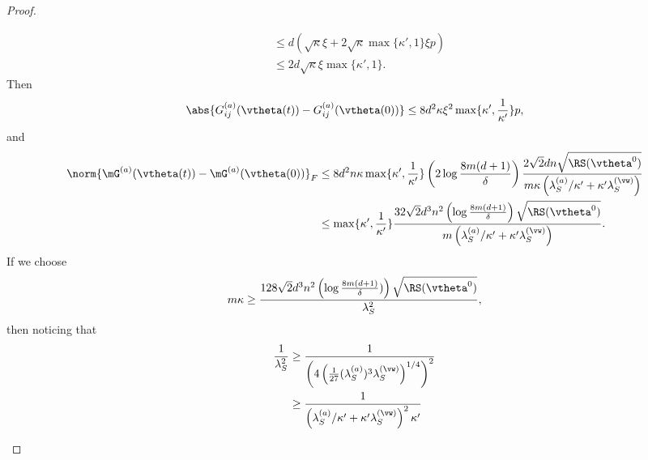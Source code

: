 \documentclass{article}
\begin{document}
\begin{proof}
\begin{enumerate}[(a)]
\begin{enumerate}[(i)]
\begin{equation}
\begin{aligned}
                                 & \leq d\left(\sqrt{\kappa}\xi+2\sqrt{\kappa}\max\{\kappa',1\}\xi p\right)          \\
                                 & \leq 2d\sqrt{\kappa}\xi\max\{\kappa',1\}.
                            \end{aligned}
                        \end{equation}
                        Then
                        \begin{equation}
                            \abs{G_{ij}^{(a)}(\vtheta(t)) - G_{ij}^{(a)}(\vtheta(0))} \leq 8d^2\kappa\xi^2\max\{\kappa',\frac{1}{\kappa'}\}p,
                        \end{equation}
                        and
                        \begin{equation}
                            \begin{aligned}
                                \norm{\mG^{(a)}(\vtheta(t)) - \mG^{(a)}(\vtheta(0))}_F
                                 & \leq 8d^2n\kappa\max\{\kappa',\frac{1}{\kappa'}\}\left(2\log\frac{8m(d+1)}{\delta}\right)\frac{2\sqrt{2}dn\sqrt{\RS(\vtheta^0)}}{m\kappa\left(\lambda_S^{(a)}/\kappa'+\kappa'\lambda_S^{(\vw)}\right)} \\
                                 & \leq\max\{\kappa',\frac{1}{\kappa'}\}\frac{32\sqrt{2}d^3n^2\left(\log\frac{8m(d+1)}{\delta}\right)\sqrt{\RS(\vtheta^0)}}{m\left(\lambda_S^{(a)}/\kappa'+\kappa'\lambda_S^{(\vw)}\right)}.
                            \end{aligned}
                        \end{equation}
                        If we choose
                        \begin{equation}\label{cond:m1}
                            m\kappa\geq\frac{128\sqrt{2}d^3n^2\left(\log\frac{8m(d+1)}{\delta})\right)\sqrt{\RS(\vtheta^0)}}{\lambda_S^2},
                        \end{equation}
                        then noticing that
                        \begin{equation}
                            \begin{aligned}
                                \frac{1}{\lambda_S^2}
                                 & \geq\frac{1}{\left(4\left(\frac{1}{27}(\lambda_S^{(a)})^3\lambda_S^{(\vw)}\right)^{1/4}\right) ^2} \\
                                 & \geq\frac{1}{\left(\lambda_S^{(a)}/\kappa'+\kappa'\lambda_S^{(\vw)}\right)^2\kappa'}               \\

\end{aligned}
\end{equation}
\end{enumerate}
\end{enumerate}
\end{proof}
\end{document}
